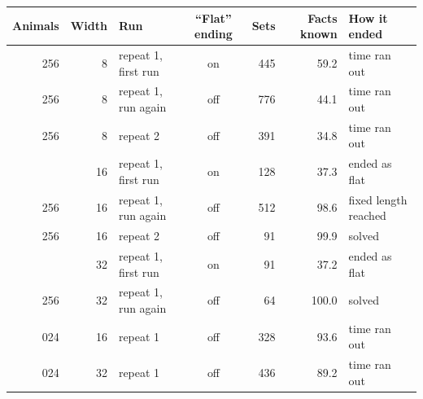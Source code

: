\begin{tabular}{@{}rrlcrrl@{}}
\toprule
Animals & Width & Run & ``Flat'' ending & Sets & Facts known & How it ended \\
\midrule
256 & 8 & repeat 1, first run & on & 445 & 59.2 & time ran out \\
256 & 8 & repeat 1, run again & off & 776 & 44.1 & time ran out \\
256 & 8 & repeat 2 & off & 391 & 34.8 & time ran out \\
\addlinespace[2pt]
256 & 16 & repeat 1, first run & on & 128 & 37.3 & ended as flat \\
256 & 16 & repeat 1, run again & off & 512 & 98.6 & fixed length reached \\
256 & 16 & repeat 2 & off & 91 & 99.9 & solved \\
\addlinespace[2pt]
256 & 32 & repeat 1, first run & on & 91 & 37.2 & ended as flat \\
256 & 32 & repeat 1, run again & off & 64 & 100.0 & solved \\
\addlinespace[2pt]
1{,}024 & 16 & repeat 1 & off & 328 & 93.6 & time ran out \\
\addlinespace[2pt]
1{,}024 & 32 & repeat 1 & off & 436 & 89.2 & time ran out \\
\bottomrule
\end{tabular}
